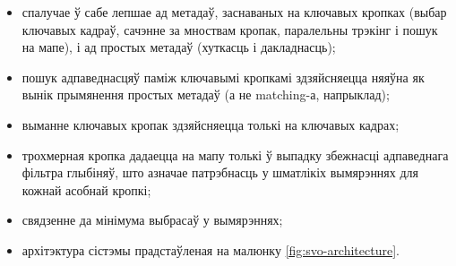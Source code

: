 \begin{itemize}
  \item спалучае ў сабе лепшае ад метадаў, заснаваных на ключавых кропках (выбар
  ключавых кадраў, сачэнне за мноствам кропак, паралельны трэкінг і пошук на мапе),
  і ад простых метадаў (хуткасць і дакладнасць);
  \item пошук адпаведнасцяў паміж ключавымі кропкамі здзяйсняецца няяўна як вынік
  прымянення простых метадаў (а не matching-а, напрыклад);
  \item выманне ключавых кропак здзяйсняецца толькі на ключавых кадрах;
  \item трохмерная кропка дадаецца на мапу толькі ў выпадку збежнасці адпаведнага
  фільтра глыбіняў, што азначае патрэбнасць у шматлікіх вымярэннях для кожнай асобнай кропкі;
  \item свядзенне да мінімума выбрасаў у вымярэннях;
  \item архітэктура сістэмы прадстаўленая на малюнку \ref{fig:svo-architecture}.
\end{itemize}

\newpage
